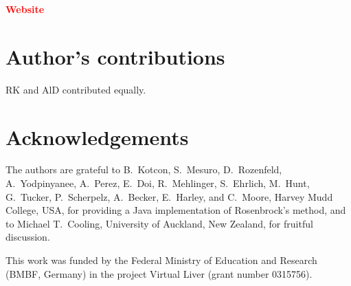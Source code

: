\documentclass[10pt]{bmc_article}
\newenvironment{bmcformat}{\baselineskip20pt\sloppy\setboolean{publ}{false}}{\baselineskip20pt\sloppy}
\newcommand{\TODO}[1]{\textcolor{red}{\textbf{#1}}}
\begin{document}
\begin{bmcformat}
\TODO{Website}

\bigskip

\section*{Author's contributions}
   RK and AlD contributed equally.

    

\section*{Acknowledgements}
The authors are grateful to B.~Kotcon, S.~Mesuro, D.~Rozenfeld, A.~Yodpinyanee,
A.~Perez, E.~Doi, R.~Mehlinger, S.~Ehrlich, M.~Hunt, G.~Tucker, P.~Scherpelz,
A.~Becker, E.~Harley, and C.~Moore, Harvey Mudd College, USA, for providing a
Java implementation of Rosenbrock's method, and to Michael T.~Cooling,
University of Auckland, New Zealand, for fruitful discussion.

This work was funded by the Federal Ministry of Education and Research (BMBF,
Germany) in the project Virtual Liver (grant number 0315756).
 

\newpage
{
   }     %




\end{bmcformat}
\end{document}
